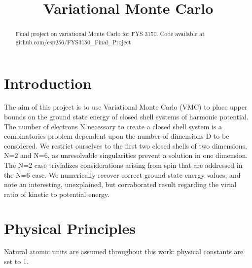 \documentclass[11pt, conference, compsocconf]{IEEEtran}
\begin{document}
\title{Variational Monte Carlo}
\author{
}
\maketitle

\begin{abstract}
Final project on variational Monte Carlo for FYS 3150. Code available at github.com/csp256/FYS3150\_Final\_Project\end{abstract}

\IEEEpeerreviewmaketitle


\section{Introduction}
The aim of this project is to use Variational Monte Carlo (VMC) to place upper bounds on the ground state energy of closed shell systems of harmonic potential. The number of electrons N necessary to create a closed shell system is a combinatorics problem dependent upon the number of dimensions D to be considered. We restrict ourselves to the first two closed shells of two dimensions, N=2 and N=6, as unresolvable singularities prevent a solution in one dimension. The N=2 case trivializes considerations arising from spin that are addressed in the N=6 case. We numerically recover correct ground state energy values, and note an interesting, unexplained, but corraborated result regarding the virial ratio of kinetic to potential energy.

\section{Physical Principles}
Natural atomic units are assumed throughout this work: physical constants are set to 1.
\end{document}
